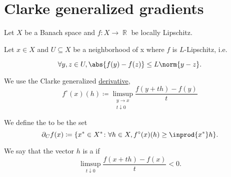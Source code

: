 \section{Clarke generalized gradients}\label{sec:clarke_gradients}

Let \( X \) be a Banach space and \( f: X \to \BbbR \) be locally Lipschitz.

\begin{definition}\label{def:clarke_gradient}
  Let \( x \in X \) and \( U \subseteq X \) be a neighborhood of x where \( f \) is \( L \)-Lipschitz, i.e.

  \begin{equation*}
    \forall y, z \in U, \abs{f(y) - f(z)} \leq L \norm{y - z}.
  \end{equation*}

  We use the Clarke generalized \hyperref[def:nonsmooth_derivatives/clarke]{derivative},
  \begin{equation*}
    f^\circ(x)(h) \coloneqq \limsup_{\substack{y \to x \\ t \downarrow 0}} \frac {f(y + th) - f(y)} t
  \end{equation*}

  We define the  to be the set
  \begin{equation*}
    \partial_C f(x) \coloneqq \{ x^* \in X^* \colon \forall h \in X, f^\circ(x)(h) \geq \inprod {x^*} h \}.
  \end{equation*}

  We say that the vector \( h \) is a  if
  \begin{equation*}
    \limsup_{t \downarrow 0} \frac {f(x + th) - f(x)} t < 0.
  \end{equation*}
\end{definition}

